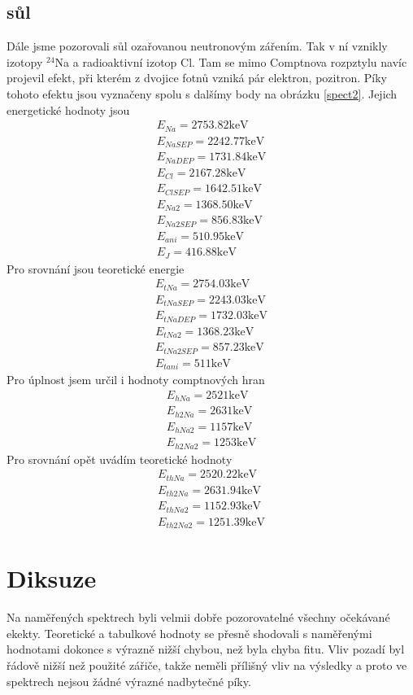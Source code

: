 \documentclass[a4paper,12pt]{article}
\begin{document}
\subsection{sůl}
Dále jsme pozorovali sůl ozařovanou neutronovým zářením. Tak v ní vznikly izotopy $^{24}$Na a radioaktivní izotop Cl.
Tam se mimo Comptnova rozpztylu navíc projevil efekt, při kterém z dvojice fotnů vzniká pár elektron, pozitron. Píky tohoto 
efektu jsou vyznačeny spolu s dalšímy body na obrázku \ref{spect2}. Jejich energetické hodnoty jsou
\begin{eqnarray}
E_{Na}=2753.82 \mbox{keV} \\
E_{NaSEP}=2242.77 \mbox{keV} \\
E_{NaDEP}=1731.84 \mbox{keV} \\
E_{Cl}=2167.28 \mbox{keV} \\
E_{ClSEP}=1642.51 \mbox{keV} \\
E_{Na2}=1368.50 \mbox{keV} \\
E_{Na2SEP}=856.83 \mbox{keV} \\
E_{ani}=510.95 \mbox{keV} \\
E_{J}=416.88 \mbox{keV}
\end{eqnarray}
Pro srovnání jsou teoretické energie 
\begin{eqnarray}
E_{tNa}=2754.03  \mbox{keV} \\
E_{tNaSEP}=2243.03 \mbox{keV} \\
E_{tNaDEP}=1732.03 \mbox{keV} \\
E_{tNa2}=1368.23  \mbox{keV} \\
E_{tNa2SEP}=857.23  \mbox{keV} \\
E_{tani}=511  \mbox{keV}
\end{eqnarray}
Pro úplnost jsem určil i hodnoty comptnových hran
\begin{eqnarray}
E_{hNa}=2521 \mbox{keV} \\
E_{h2Na}=2631 \mbox{keV} \\
E_{hNa2}=1157 \mbox{keV} \\
E_{h2Na2}=1253 \mbox{keV}
\end{eqnarray}
Pro srovnání opět uvádím teoretické hodnoty
\begin{eqnarray}
E_{thNa}=2520.22 \mbox{keV} \\
E_{th2Na}=2631.94 \mbox{keV} \\
E_{thNa2}=1152.93 \mbox{keV} \\
E_{th2Na2}=1251.39 \mbox{keV}
\end{eqnarray}

\section{Diksuze}
Na naměřených spektrech byli velmii dobře pozorovatelné všechny očekávané ekekty. Teoretické a tabulkové hodnoty se přesně  shodovali s naměřenými hodnotami dokonce s výrazně nižší chybou, než byla chyba fitu. Vliv pozadí byl řádově nižší než použité zářiče, takže neměli přílišný vliv na výsledky a proto ve spektrech nejsou žádné výrazné nadbytečné píky.
\end{document}
